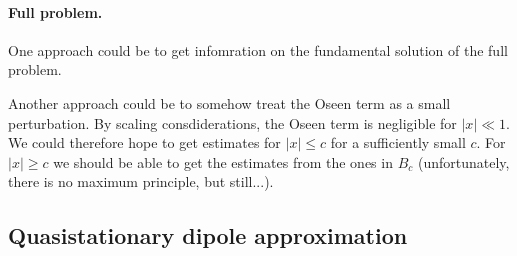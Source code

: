 \documentclass[abstracton, paper=a4, fontsize=11pt,DIV=12,bibliography=totoc]{scrartcl}
\begin{document}
\paragraph{Full problem.}

One approach could be to get infomration on the fundamental solution of the full problem. 

Another approach could be to somehow treat the Oseen term as a small perturbation. By scaling consdiderations, the Oseen term is negligible for $|x| \ll 1$. We could therefore hope to get estimates for $|x| \leq c$ for a sufficiently small $c$. For $|x| \geq c$ we should be able to get the estimates from the ones in $B_c$ (unfortunately, there is no maximum principle, but still...).

\subsection{Quasistationary dipole approximation}
\end{document}
